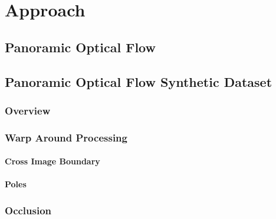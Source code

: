 

\chapter{Approach}

\section{Panoramic Optical Flow}



\section{Panoramic Optical Flow Synthetic Dataset}


\subsection{Overview}


\subsection{Warp Around Processing}


\subsubsection{Cross Image Boundary}


\subsubsection{Poles}


\subsection{Occlusion}


